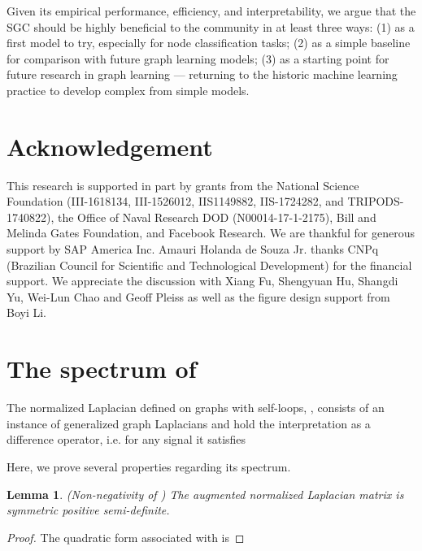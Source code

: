 \documentclass{article}
\newtheorem{lemma}{Lemma}
\newcommand{\method}{SGC}
\begin{document}
Given its empirical performance, efficiency, and interpretability, we argue that the \method{} should be highly beneficial to the community in at least three ways:
(1) as a first model to try, especially for node classification tasks; 
(2) as a simple baseline for comparison with future graph learning models; 
(3) as a starting point for future research in graph learning --- returning to the historic machine learning practice to develop complex from simple models. 

 

\section*{Acknowledgement}
This research is supported in part by grants from the National
Science Foundation (III-1618134, III-1526012, IIS1149882,
IIS-1724282, and TRIPODS-1740822), the Office
of Naval Research DOD (N00014-17-1-2175), 
Bill and Melinda Gates Foundation, and 
Facebook Research. We are thankful for
generous support by SAP America Inc. 
Amauri Holanda de Souza Jr. thanks CNPq (Brazilian Council for Scientific and Technological Development) for the financial support.
We appreciate the discussion with Xiang Fu, Shengyuan Hu, Shangdi Yu, Wei-Lun Chao and Geoff Pleiss as well as the figure design support from Boyi Li.









\clearpage


\appendix

\section{The spectrum of }

The normalized Laplacian defined on graphs with self-loops, , consists of an instance of generalized graph Laplacians and hold the interpretation as a difference operator, i.e. for any signal  it satisfies 


Here, we prove several properties regarding its spectrum.

\begin{lemma}
(Non-negativity of ) The augmented normalized Laplacian matrix is symmetric positive semi-definite.
\end{lemma}
\begin{proof}

The quadratic form associated with  is



\end{proof}
\end{document}
